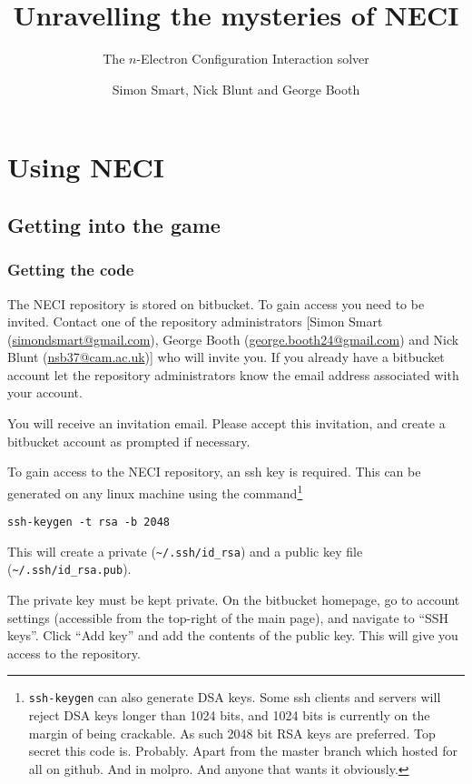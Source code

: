 \documentclass[a4paper,notitlepage]{scrreprt}
\makeatletter
\let\code\lstinline
\newcommand*{\toccontents}{\@starttoc{toc}}
\makeatother
\begin{document}
\author{Simon Smart, Nick Blunt and George Booth}
\title{Unravelling the mysteries of NECI}
\subtitle{The $n$-Electron Configuration Interaction solver}
\maketitle

\toccontents

\chapter{Using NECI}
\section{Getting into the game}
\subsection{Getting the code}
	The NECI repository is stored on bitbucket. To gain access you need to be
	invited. Contact one of the repository administrators
	[Simon Smart (\url{simondsmart@gmail.com}), George Booth
	(\url{george.booth24@gmail.com}) and Nick Blunt (\url{nsb37@cam.ac.uk})] who will
	invite you. If you already have a bitbucket account let the repository
	administrators know the email address associated with your account.

	You will receive an invitation email. Please accept this invitation, and
	create a bitbucket account as prompted if necessary.

	To gain access to the NECI repository, an ssh key is required. This can
	be generated on any linux machine using the command\footnote{%
		\code{ssh-keygen} can also generate DSA keys. Some ssh clients and
		servers will reject DSA keys longer than 1024 bits, and 1024 bits is
		currently on the margin of being crackable. As such 2048 bit RSA keys
		are preferred. Top secret this code is. Probably. Apart from the master branch which hosted for all on github. And in molpro.
		And anyone that wants it obviously.
	}
	\begin{lstlisting}[gobble=4]
		ssh-keygen -t rsa -b 2048
	\end{lstlisting}%
	This will create a private (\code{~/.ssh/id_rsa}) and a public key
	file (\code{~/.ssh/id_rsa.pub}).

	The private key must be kept private. On the bitbucket homepage, go to
	account settings (accessible from the top-right	of the main page), and
	navigate to ``SSH keys''. Click ``Add key'' and add the contents of the
	public key. This will give you access to the repository.
\end{document}
